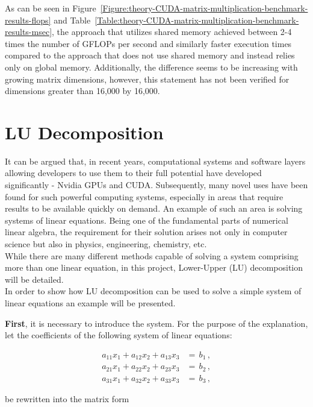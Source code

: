 As can be seen in Figure~\ref{Figure:theory-CUDA-matrix-multiplication-benchmark-results-flops} and Table~\ref{Table:theory-CUDA-matrix-multiplication-benchmark-results-msec}, the approach that utilizes shared memory achieved between 2-4 times the number of GFLOPs per second and similarly faster execution times compared to the approach that does not use shared memory and instead relies only on global memory. Additionally, the difference seems to be increasing with growing matrix dimensions, however, this statement has not been verified for dimensions greater than 16,000 by 16,000.



\section{LU Decomposition}\label{Section:theory-LU-decomposition}
It can be argued that, in recent years, computational systems and software layers allowing developers to use them to their full potential have developed significantly - Nvidia GPUs and CUDA. Subsequently, many novel uses have been found for such powerful computing systems, especially in areas that require results to be available quickly on demand. An example of such an area is solving systems of linear equations. Being one of the fundamental parts of numerical linear algebra, the requirement for their solution arises not only in computer science but also in physics, engineering, chemistry, etc. \\
While there are many different methods capable of solving a system comprising more than one linear equation, in this project, Lower-Upper (LU) decomposition will be detailed. \\
In order to show how LU decomposition can be used to solve a simple system of linear equations an example will be presented. 
\par \textbf{First}, it is necessary to introduce the system. For the purpose of the explanation, let the coefficients of the following system of linear equations:

\begin{align}
	a_{11}x_1 + a_{12}x_2 + a_{13}x_{3}&= \,b_1 \nonumber\,, \\ 
	a_{21}x_1 + a_{22}x_2 + a_{23}x_{3}&= \,b_2 \label{Equation:theory-LU-decomposition-system-linear-equations}\,, \\
	a_{31}x_1 + a_{32}x_2 + a_{33}x_{3}&= \,b_3 \nonumber\,,
\end{align}

be rewritten into the matrix form

